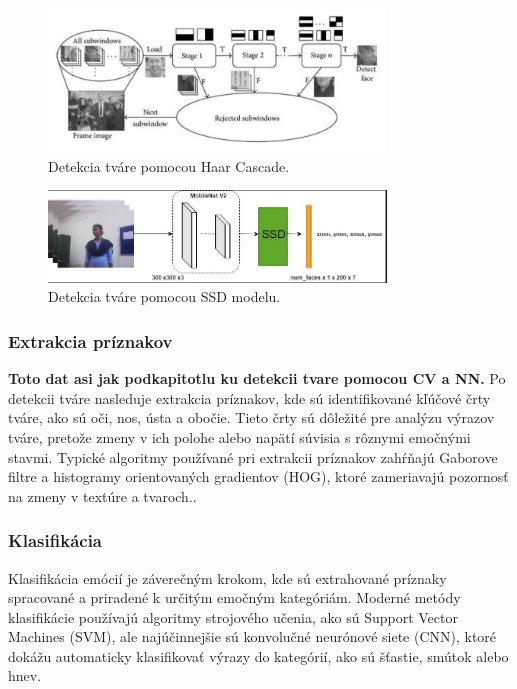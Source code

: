\begin{figure}[!htpb]
    \centering
    \includegraphics[width=0.8\textwidth]{img/haar_cascade.png}
    \caption{Detekcia tváre pomocou Haar Cascade.} 
    \label{fig:haar_cascade}
\end{figure}

\begin{figure}[!htpb]
    \centering
    \includegraphics[width=0.8\textwidth]{img/ssd_model.png}
    \caption{Detekcia tváre pomocou SSD modelu.} 
    \label{fig:ssd_model}
\end{figure}
\subsubsection{Extrakcia príznakov}
\textbf{Toto dat asi jak podkapitotlu ku detekcii tvare pomocou CV a NN.}
Po detekcii tváre nasleduje extrakcia príznakov, kde sú identifikované kľúčové črty tváre, ako sú oči, nos, ústa a obočie. Tieto črty sú dôležité pre analýzu výrazov tváre, pretože zmeny v ich polohe 
alebo napätí súvisia s rôznymi emočnými stavmi​. \cite{inProceedings01} Typické algoritmy používané pri extrakcii príznakov zahŕňajú Gaborove filtre a histogramy orientovaných gradientov (HOG), 
ktoré zameriavajú pozornosť na zmeny v textúre a tvaroch​.\cite{article03}.
\subsubsection{Klasifikácia}
Klasifikácia emócií je záverečným krokom, kde sú extrahované príznaky spracované a priradené k určitým emočným kategóriám. Moderné metódy klasifikácie používajú algoritmy strojového učenia, 
ako sú Support Vector Machines (SVM), ale najúčinnejšie sú konvolučné neurónové siete (CNN), ktoré dokážu automaticky klasifikovať výrazy do kategórií, ako sú šťastie, smútok alebo hnev​. \cite{inProceedings01} \cite{article03}

